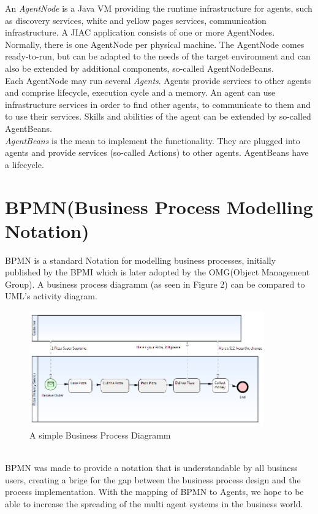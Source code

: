 An \textit{AgentNode} is a Java VM providing the runtime infrastructure for agents, such
as discovery services, white and yellow pages services, communication infrastructure. A
JIAC application consists of one or more AgentNodes. Normally, there is one AgentNode
per physical machine. The AgentNode comes ready-to-run, but can be adapted to the
needs of the target environment and can also be extended by additional components,
so-called AgentNodeBeans.\\
Each AgentNode may run several \textit{Agents}. Agents provide services to other agents
and comprise lifecycle, execution cycle and a memory. An agent can use infrastructure
services in order to find other agents, to communicate to them and to use their services.
Skills and abilities of the agent can be extended by so-called AgentBeans.\\
\textit{AgentBeans} is the mean to implement the functionality. They are plugged into agents
and provide services (so-called Actions) to other agents. AgentBeans have a lifecycle.

\section{BPMN(Business Process Modelling Notation)}
BPMN \cite{6} is a standard Notation for modelling business processes, initially published by the BPMI which is later adopted by the OMG(Object Management Group). A business process diagramm (as seen in Figure 2) can be compared to UML's activity diagram.
\begin{figure}[h]
	\centering
		\includegraphics[width=0.90\textwidth]{images/bpmn_sampl.png}
	\caption{A simple Business Process Diagramm}
	\label{fig:bpmn_sampl}
\end{figure}\\
BPMN was made to provide a notation that is understandable by all business users, creating a brige for the gap between the business process design and the process implementation. With the mapping of BPMN to Agents, we hope to be able to increase the spreading of the multi agent systems in the business world.


